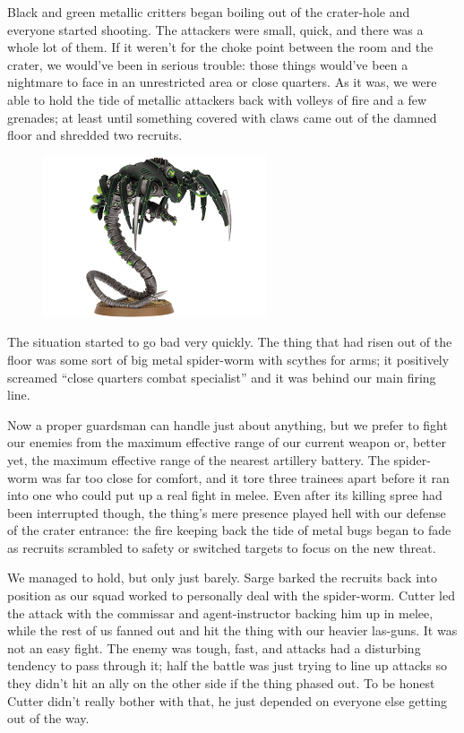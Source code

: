 Black and green metallic critters began boiling out of the crater-hole and everyone started shooting. 
The attackers were small, quick, and there was a whole lot of them. 
If it weren’t for the choke point between the room and the crater, we would’ve been in serious trouble: 
those things would’ve been a nightmare to face in an unrestricted area or close quarters. 
As it was, we were able to hold the tide of metallic attackers back with volleys of fire and a few grenades; 
at least until something covered with claws came out of the damned floor and shredded two recruits.

\begin{figure}
	\begin{center}
		\includegraphics[width=\figwidth]{pics/8/42.png}
	\end{center}
\end{figure}
The situation started to go bad very quickly. 
The thing that had risen out of the floor was some sort of big metal spider-worm with scythes for arms; 
it positively screamed “close quarters combat specialist” and it was behind our main firing line. 


Now a proper guardsman can handle just about anything, but we prefer to fight our enemies from the maximum effective range of our current weapon or, better yet, the maximum effective range of the nearest artillery battery. 
The spider-worm was far too close for comfort, and it tore three trainees apart before it ran into one who could put up a real fight in melee. 
Even after its killing spree had been interrupted though, the thing’s mere presence played hell with our defense of the crater entrance: 
the fire keeping back the tide of metal bugs began to fade as recruits scrambled to safety or switched targets to focus on the new threat.

We managed to hold, but only just barely. 
Sarge barked the recruits back into position as our squad worked to personally deal with the spider-worm. 
Cutter led the attack with the commissar and agent-instructor backing him up in melee, while the rest of us fanned out and hit the thing with our heavier las-guns. 
It was not an easy fight. 
The enemy was tough, fast, and attacks had a disturbing tendency to pass through it; 
half the battle was just trying to line up attacks so they didn’t hit an ally on the other side if the thing phased out. 
To be honest Cutter didn’t really bother with that, he just depended on everyone else getting out of the way.

